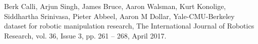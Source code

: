 \documentclass[11pt,  a4paper, openany]{book}
\begin{document}


\setcounter{page}{0}
\pagestyle{empty}
\clearpage

\pagestyle{plain}
\tableofcontents
\clearpage

\setcounter{page}{1}









\begin{thebibliography}{1}
Berk Calli, Arjun Singh, James Bruce, Aaron Walsman, Kurt Konolige, Siddhartha Srinivasa, Pieter Abbeel, Aaron M Dollar, Yale-CMU-Berkeley dataset for robotic manipulation research, The International Journal of Robotics Research, vol. 36, Issue 3, pp. 261 – 268, April 2017.

\end{thebibliography}
\end{document}
